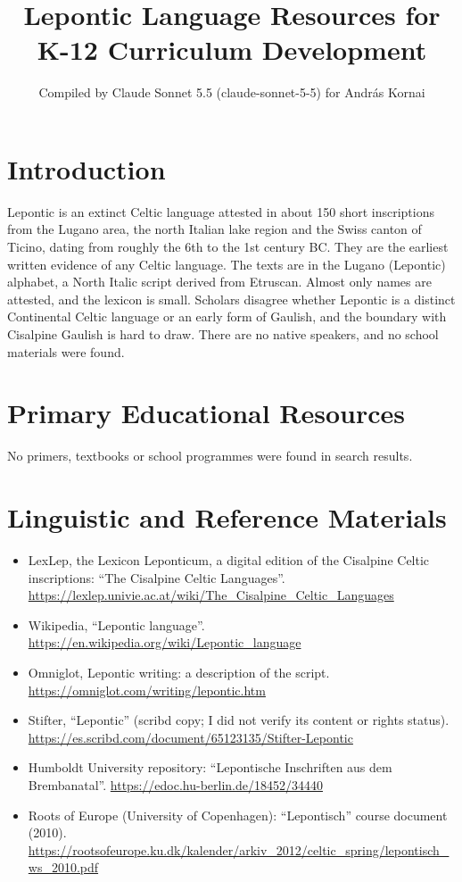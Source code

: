 \documentclass[12pt]{article}
\title{Lepontic Language Resources for K-12 Curriculum Development}
\author{Compiled by Claude Sonnet 5.5 (claude-sonnet-5-5) for Andr\'as Kornai}
\date{}
\begin{document}
\maketitle

\section{Introduction}
Lepontic is an extinct Celtic language attested in about 150 short inscriptions from the Lugano area, the north Italian lake region and the Swiss canton of Ticino, dating from roughly the 6th to the 1st century BC. They are the earliest written evidence of any Celtic language. The texts are in the Lugano (Lepontic) alphabet, a North Italic script derived from Etruscan. Almost only names are attested, and the lexicon is small. Scholars disagree whether Lepontic is a distinct Continental Celtic language or an early form of Gaulish, and the boundary with Cisalpine Gaulish is hard to draw. There are no native speakers, and no school materials were found.

\section{Primary Educational Resources}
No primers, textbooks or school programmes were found in search results.

\section{Linguistic and Reference Materials}
\begin{itemize}
\item LexLep, the Lexicon Leponticum, a digital edition of the Cisalpine Celtic inscriptions: ``The Cisalpine Celtic Languages''. \url{https://lexlep.univie.ac.at/wiki/The_Cisalpine_Celtic_Languages}
\item Wikipedia, ``Lepontic language''. \url{https://en.wikipedia.org/wiki/Lepontic_language}
\item Omniglot, Lepontic writing: a description of the script. \url{https://omniglot.com/writing/lepontic.htm}
\item Stifter, ``Lepontic'' (scribd copy; I did not verify its content or rights status). \url{https://es.scribd.com/document/65123135/Stifter-Lepontic}
\item Humboldt University repository: ``Lepontische Inschriften aus dem Brembanatal''. \url{https://edoc.hu-berlin.de/18452/34440}
\item Roots of Europe (University of Copenhagen): ``Lepontisch'' course document (2010). \url{https://rootsofeurope.ku.dk/kalender/arkiv_2012/celtic_spring/lepontisch_ws_2010.pdf}
\end{itemize}
\end{document}
